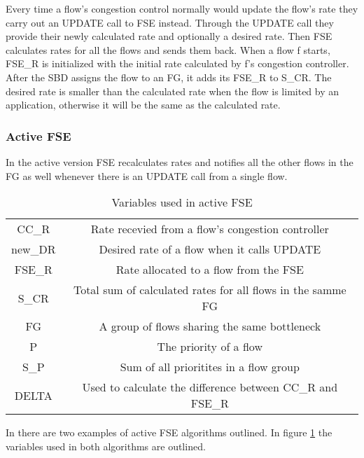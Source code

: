 \documentclass[UKenglish]{ifimaster}
\begin{document}
Every time a flow's congestion control normally would update the flow's rate they carry out an UPDATE call to FSE instead. 
Through the UPDATE call they provide their newly calculated rate and optionally a desired rate. 
Then FSE calculates rates for all the flows and sends them back. 
When a flow f starts, FSE\_R is initialized with the initial rate calculated by f's congestion controller. 
After the SBD assigns the flow to an FG, it adds its FSE\_R to S\_CR.
The desired rate is smaller than the calculated rate when the flow is limited by an application, otherwise it will be the same as the calculated rate.

\subsubsection{Active FSE}
In the active version FSE recalculates rates and notifies all the other flows in the FG as well whenever there is an UPDATE call from a single flow. 

\begin{table}
\begin{center}
    \begin{tabular}{|c|c|}
        \hline
        CC\_R & Rate recevied from a flow's congestion controller \\
        new\_DR & Desired rate of a flow when it calls UPDATE \\
        FSE\_R & Rate allocated to a flow from the FSE \\
        S\_CR & Total sum of calculated rates for all flows in the samme FG \\ 
        FG & A group of flows sharing the same bottleneck \\
        P & The priority of a flow \\
        S\_P & Sum of all prioritites in a flow group \\
        DELTA & Used to calculate the difference between CC\_R and FSE\_R \\  
        \hline
    \end{tabular}
\end{center}
\caption{Variables used in active FSE}
\label{active_fse_variables}
\end{table}

In \cite{rfc8699} there are two examples of active FSE algorithms outlined.
In figure \ref{active_fse_variables} the variables used in both algorithms are outlined. 
\end{document}
